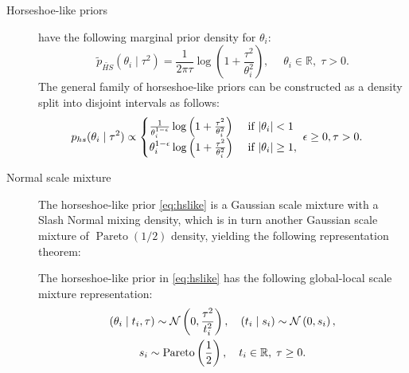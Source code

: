 \documentclass[sts,preprint]{imsart}
\begin{document}
\begin{description}
  \item[Horseshoe-like priors] 
    \citet{bhadra2017horseshoe} have the following marginal prior density for
    $\theta_i$: 
    \begin{equation}
      \tilde p_{\tilde{HS}} (\theta_i \mid \tau^2) = \frac{1}{2 \pi{\tau}}\log
      \left ( 1 + \frac{\tau^2}{\theta_i^2} \right ), \quad  \; \theta_i  \in
      \mathbb{R},\; \tau > 0. \label{eq:hslike}
    \end{equation}
    The general family of horseshoe-like priors can be constructed as a density
    split into disjoint intervals as follows:
    \begin{align}
      p_{hs}(\theta_i \mid \tau^2)&  \propto \begin{cases}
        \frac{1}{\theta_i^{1-\epsilon}}\log \left( 1 + \frac{\tau^2}{\theta_i^2}
          \right) & \text{ if } {\lvert\theta_i\rvert < 1} \\ \theta_i^{1-\epsilon}
          \log \left( 1 + \frac{\tau^2}{\theta_i^2} \right) & \text{ if
        }{\lvert\theta_i\rvert \ge 1}, \\ \end{cases} \; \epsilon \ge 0,\tau > 0.
        \label{eq:split} 
    \end{align}
  \item[Normal scale mixture] 
    The horseshoe-like prior \eqref{eq:hslike} is a Gaussian scale mixture with  a Slash Normal mixing density, which is in turn another Gaussian scale mixture of $\operatorname{Pareto}(1/2)$ density, yielding the following representation theorem: 
    \begin{theorem}\label{th:hslike}
      The horseshoe-like prior in \eqref{eq:hslike} has the following global-local scale mixture representation:
      \begin{equation}
        \begin{gathered}
    (\theta_i \mid t_i, \tau) \sim {\cal N}\left(0, \frac{\tau^2}{t_i^2} \right),\quad (t_i \mid s_i) \sim {\cal N}\left(0, s_i \right),\\
          s_i \sim \operatorname{Pareto}\left( \frac{1}{2} \right), \quad t_i \in \mathbb{R}, \; \tau \ge 0.
        \end{gathered}\label{eq:pareto}
      \end{equation}
    \end{theorem}
\end{description}
\end{document}
